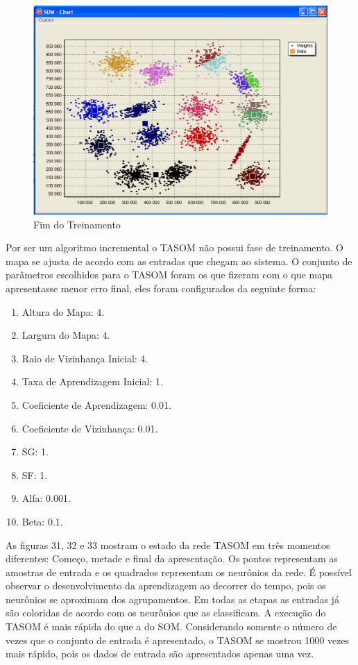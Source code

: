 \begin{figure}[!h]
\centering
\includegraphics[keepaspectratio=true,scale=0.5]
{figuras/som3.eps}
\caption{Fim do Treinamento}
\label{data_titatic}
\end{figure} 

Por ser um algoritmo incremental o TASOM não possui fase de treinamento. O mapa se ajusta de acordo com as entradas que chegam ao sistema. O conjunto de parâmetros escolhidos para o TASOM foram os que fizeram com o que mapa apresentasse menor erro final, eles foram configurados da seguinte forma: 

\begin{enumerate}
\item Altura do Mapa: 4.
\item Largura do Mapa: 4.
\item Raio de Vizinhança Inicial: 4.
\item Taxa de Aprendizagem Inicial: 1.
\item Coeficiente de Aprendizagem: 0.01.
\item Coeficiente de Vizinhança: 0.01.
\item SG: 1.
\item SF: 1.
\item Alfa: 0.001.
\item Beta: 0.1.
\end{enumerate}


As figuras 31, 32 e 33 mostram o estado da rede TASOM em três momentos diferentes: Começo, metade e final da apresentação. Os pontos representam as amostras de entrada e os quadrados representam os neurônios da rede. É possível observar o desenvolvimento da aprendizagem ao decorrer do tempo, pois os neurônios se aproximam dos agrupamentos. Em todas as etapas as entradas já são coloridas de acordo com os neurônios que as classificam. A execução do TASOM é mais rápida do que a do SOM. Considerando somente o número de vezes que o conjunto de entrada é apresentado, o TASOM se mostrou 1000 vezes mais rápido, pois os dados de entrada são apresentados apenas uma vez.


